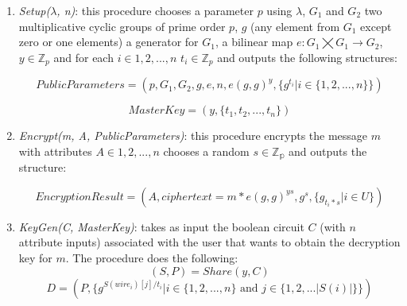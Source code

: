 \documentclass[12pt]{article}
\begin{document}
\begin{enumerate}
	\item \textit{Setup($\lambda$, n)}: this procedure chooses a parameter $p$ using $\lambda$, $G_1$ and $G_2$ two multiplicative cyclic groups of prime order $p$, $g$ (any element from $G_1$ except zero or one elements) a generator for $G_1$, a bilinear map $e : G_1 \bigtimes G_1 \rightarrow G_2$, $y \in \mathbb{Z}_p$ and for each $i \in {1, 2, ...,n}$ $t_i \in \mathbb{Z}_p$ and outputs the following structures:

	$$PublicParameters = (p, G_1, G_2, g, e, n, e(g, g)^y, \{g^{t_i} | i \in \{1, 2, ..., n\}\})$$

	$$MasterKey = (y, \{t_1, t_2, ..., t_n\})$$

	\item \textit{Encrypt(m, A, PublicParameters)}: this procedure encrypts the message $m$ with attributes $A \in {1, 2, ..., n}$ chooses a random $s \in \mathbb{Z_p}$ and outputs the structure:

	$$EncryptionResult = (A, ciphertext = m * e(g, g)^{ys}, g^s, \{g_{t_i * s} | i \in U\})$$

	\item \textit{KeyGen(C, MasterKey)}: takes as input the boolean circuit $C$ (with $n$ attribute inputs) associated with the user that wants to obtain the decryption key for $m$. The procedure does the following:
		$$(S, P) = Share(y, C)$$
		$$D = (P, \{g^{S(wire_i)[j] / t_i} | i \in \{1, 2, ..., n\} \textrm{ and } j \in \{1, 2, ... |S(i)|\}\})$$


\end{enumerate}
\end{document}
